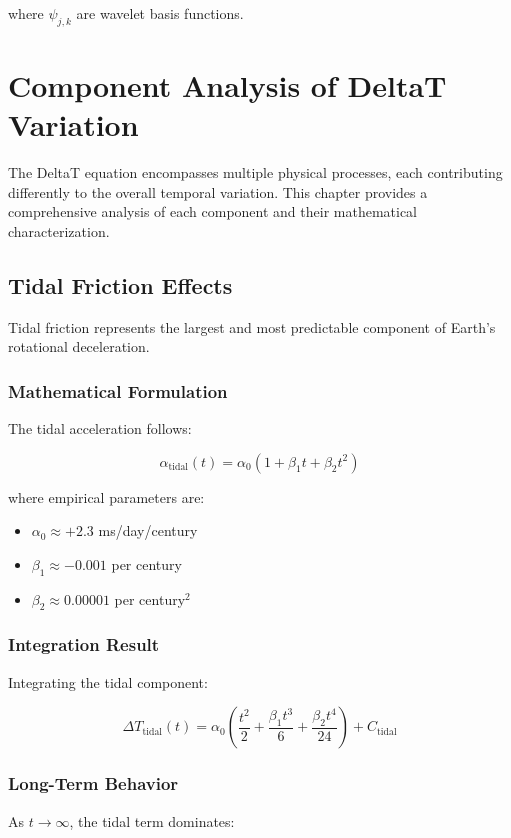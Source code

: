 \documentclass[12pt,a4paper]{report}
\begin{document}
where $\psi_{j,k}$ are wavelet basis functions.

\chapter{Component Analysis of DeltaT Variation}

The DeltaT equation encompasses multiple physical processes, each contributing differently to the overall temporal variation. This chapter provides a comprehensive analysis of each component and their mathematical characterization.

\section{Tidal Friction Effects}

Tidal friction represents the largest and most predictable component of Earth's rotational deceleration.

\subsection{Mathematical Formulation}

The tidal acceleration follows:

\[
\alpha_{\text{tidal}}(t) = \alpha_0 \left(1 + \beta_1 t + \beta_2 t^2\right)
\]

where empirical parameters are:
\begin{itemize}
\item $\alpha_0 \approx +2.3$ ms/day/century
\item $\beta_1 \approx -0.001$ per century
\item $\beta_2 \approx 0.00001$ per century$^2$
\end{itemize}

\subsection{Integration Result}

Integrating the tidal component:

\[
\Delta T_{\text{tidal}}(t) = \alpha_0 \left(\frac{t^2}{2} + \frac{\beta_1 t^3}{6} + \frac{\beta_2 t^4}{24}\right) + C_{\text{tidal}}
\]

\subsection{Long-Term Behavior}

As $t \to \infty$, the tidal term dominates:
\end{document}
